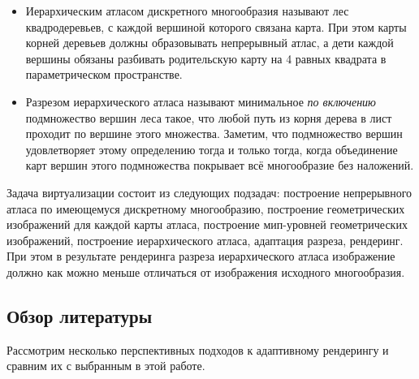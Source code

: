 \begin{itemize}
\item Иерархическим атласом \cite{niski2007multi} дискретного многообразия называют лес квадродеревьев, с каждой вершиной которого связана карта. При этом карты корней деревьев должны образовывать непрерывный атлас, а дети каждой вершины обязаны разбивать родительскую карту на 4 равных квадрата в параметрическом пространстве.
\item Разрезом иерархического атласа называют минимальное \emph{по включению} подмножество вершин леса такое, что любой путь из корня дерева в лист проходит по вершине этого множества. Заметим, что подмножество вершин удовлетворяет этому определению тогда и только тогда, когда объединение карт вершин этого подмножества покрывает всё многообразие без наложений.
\end{itemize}

Задача виртуализации состоит из следующих подзадач: построение непрерывного атласа по имеющемуся дискретному многообразию, построение геометрических изображений для каждой карты атласа, построение мип-уровней геометрических изображений, построение иерархического атласа, адаптация разреза, рендеринг. При этом в результате рендеринга разреза иерархического атласа изображение должно как можно меньше отличаться от изображения исходного многообразия.

\subsection{Обзор литературы}
\label{sec:related}
Рассмотрим несколько перспективных подходов к адаптивному рендерингу и сравним их с выбранным в этой работе.

